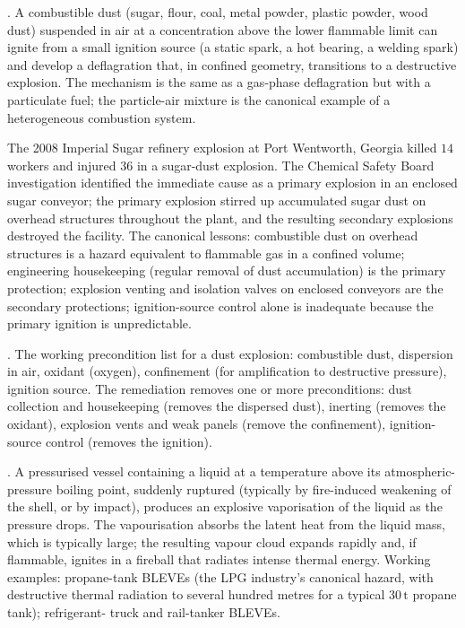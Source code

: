 . A combustible dust (sugar, flour, coal,
metal powder, plastic powder, wood dust) suspended in air at a
concentration above the lower flammable limit can ignite from a small
ignition source (a static spark, a hot bearing, a welding spark) and
develop a deflagration that, in confined geometry, transitions to a
destructive explosion. The mechanism is the same as a gas-phase
deflagration but with a particulate fuel; the particle-air mixture
is the canonical example of a heterogeneous combustion system.

The 2008 Imperial Sugar refinery explosion at Port Wentworth, Georgia
\cite{acc:csb-imperial-sugar-2009} killed $14$ workers and injured
$36$ in a sugar-dust explosion. The Chemical Safety Board investigation
identified the immediate cause as a primary explosion in an enclosed
sugar conveyor; the primary explosion stirred up accumulated sugar
dust on overhead structures throughout the plant, and the resulting
secondary explosions destroyed the facility. The canonical lessons:
combustible dust on overhead structures is a hazard equivalent to
flammable gas in a confined volume; engineering housekeeping (regular
removal of dust accumulation) is the primary protection; explosion
venting and isolation valves on enclosed conveyors are the secondary
protections; ignition-source control alone is inadequate because the
primary ignition is unpredictable.

. The working precondition
list for a dust explosion: combustible dust, dispersion in air,
oxidant (oxygen), confinement (for amplification to destructive
pressure), ignition source. The remediation removes one or more
preconditions: dust collection and housekeeping (removes the dispersed
dust), inerting (removes the oxidant), explosion vents and weak panels
(remove the confinement), ignition-source control (removes the
ignition).

. A
pressurised vessel containing a liquid at a temperature above its
atmospheric-pressure boiling point, suddenly ruptured (typically by
fire-induced weakening of the shell, or by impact), produces an
explosive vaporisation of the liquid as the pressure drops. The
vapourisation absorbs the latent heat from the liquid mass, which is
typically large; the resulting vapour cloud expands rapidly and, if
flammable, ignites in a fireball that radiates intense thermal
energy. Working examples: propane-tank BLEVEs (the LPG industry's
canonical hazard, with destructive thermal radiation to several
hundred metres for a typical $30\,\text{t}$ propane tank); refrigerant-
truck and rail-tanker BLEVEs.

